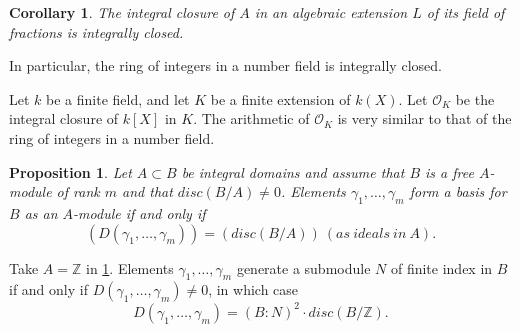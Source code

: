 \documentclass[11pt,a4paper,reqno]{amsart}
\numberwithin{equation}{section}
\newtheorem{lem}[thm]{Lemma}
\newtheorem{prop}[thm]{Proposition}
\newtheorem{cor}[thm]{Corollary}
\newtheorem{ex}[thm]{Example}
\newtheorem{rmk}[thm]{Remark}
\begin{document}
\begin{cor} \label{cor 2.16} 
The integral closure of $A$ in an algebraic extension $L$ of its field of fractions is integrally closed. 
\end{cor} 

In particular, the ring of integers in a number field is integrally closed. 

Let $k$ be a finite field, and let $K$ be a finite extension of $k(X)$. 
Let $\mathcal{O}_K$ be the integral closure of $k[X]$ in $K$. 
The arithmetic of $\mathcal{O}_K$ is very similar to that of the ring of integers in a number field. 



\begin{prop} \label{prop 2.24} 
Let $A \subset B$ be integral domains and assume that $B$ is a free $A$-module of rank $m$ and that $disc(B/A)\neq 0$. 
Elements $\gamma_1,\dots ,\gamma_m$ form a basis for $B$ as an $A$-module if and only if 
\[ 
(D(\gamma_1,\dots,\gamma_m ))=(disc(B/A))~(as~ideals~in~A). 
\] 
\end{prop} 

Take $A=\mathbb{Z}$ in \ref{prop 2.24}. Elements $\gamma_1 , \dots, \gamma_m$ generate a submodule $N$ of finite index in $B$ 
if and only if $D(\gamma_1,\dots,\gamma_m )\neq 0$, in which case 
\[ 
D(\gamma_1,\dots,\gamma_m)=(B:N)^2 \cdot disc(B/\mathbb{Z}). 
\] 

\end{document}
